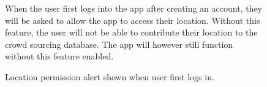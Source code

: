 \begin{figure}
    \centering
    \begin{minipage}{.5\textwidth}
      \centering
      \caption{Location permission alert shown when user first logs in.}
      \label{fig:result_permission}
    \end{minipage}%
    \begin{minipage}{.5\textwidth}
        When the user first logs into the app after creating an account, they will be asked to allow the app to access their location. Without this feature, the user will not be able to contribute their location to the crowd sourcing database. The app will however still function without this feature enabled.
    \end{minipage}
\end{figure}

